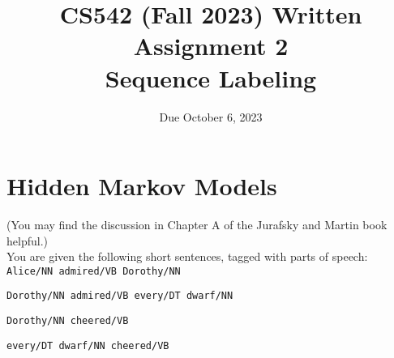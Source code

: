 \documentclass[11pt,letterpaper]{article}
\begin{document}
\title{CS542 (Fall 2023) Written Assignment 2\\Sequence Labeling}
\author{Due October 6, 2023}
\date{}
\maketitle

\section{Hidden Markov Models}

(You may find the discussion in Chapter A of the Jurafsky and Martin book helpful.)\\

\noindent You are given the following short sentences, tagged with parts of speech:\\

\texttt{Alice/NN admired/VB Dorothy/NN}

\texttt{Dorothy/NN admired/VB every/DT dwarf/NN}

\texttt{Dorothy/NN cheered/VB}

\texttt{every/DT dwarf/NN cheered/VB}
\end{document}
